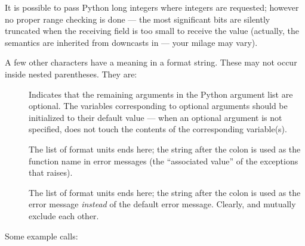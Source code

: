 \documentclass{manual}
\begin{document}
It is possible to pass Python long integers where integers are
requested; however no proper range checking is done --- the most
significant bits are silently truncated when the receiving field is
too small to receive the value (actually, the semantics are inherited
from downcasts in \C{} --- your milage may vary).

A few other characters have a meaning in a format string.  These may
not occur inside nested parentheses.  They are:

\begin{description}

\item[\samp{|}]
Indicates that the remaining arguments in the Python argument list are
optional.  The \C{} variables corresponding to optional arguments should
be initialized to their default value --- when an optional argument is
not specified,  does not touch the contents
of the corresponding \C{} variable(s).

\item[\samp{:}]
The list of format units ends here; the string after the colon is used
as the function name in error messages (the ``associated value'' of
the exceptions that  raises).

\item[\samp{;}]
The list of format units ends here; the string after the colon is used
as the error message \emph{instead} of the default error message.
Clearly, \samp{:} and \samp{;} mutually exclude each other.

\end{description}

Some example calls:
\end{document}
